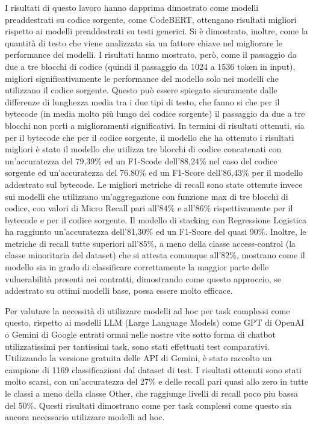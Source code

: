 \documentclass[../../Thesis.tex]{subfiles}
\begin{document}
I risultati di questo lavoro hanno dapprima dimostrato come modelli preaddestrati su codice sorgente, come CodeBERT, ottengano risultati migliori rispetto ai modelli preaddestrati su testi generici. Si \`e dimostrato, inoltre, come la quantit\`a di testo che viene analizzata sia un fattore chiave nel migliorare le performance dei modelli. I risultati hanno mostrato, per\`o, come il passaggio da due a tre blocchi di codice (quindi il passaggio da 1024 a 1536 token in input), migliori significativamente le performance del modello solo nei modelli che utilizzano il codice sorgente. Questo pu\`o essere spiegato sicuramente dalle differenze di lunghezza media tra i due tipi di testo, che fanno si che per il bytecode (in media molto pi\`u lungo del codice sorgente) il passaggio da due a tre blocchi non porti a miglioramenti significativi. 
In termini di risultati ottenuti, sia per il bytecode che per il codice sorgente, il modello che ha ottenuto i risultati migliori \`e stato il modello che utilizza tre blocchi di codice concatenati con un'accuratezza del 79,39\% ed un F1-Scode dell'88,24\% nel caso del codice sorgente ed un'accuratezza del 76.80\% ed un F1-Score dell'86,43\% per il modello addestrato sul bytecode. Le migliori metriche di recall sono state ottenute invece sui modelli che utilizzano  un'aggregazione con funzione max di tre blocchi di codice, con valori di Micro Recall pari all'84\% e all'86\% rispettivamente per il bytecode e per il codice sorgente.
Il modello di stacking con Regressione Logistica ha raggiunto un'accuratezza dell'81,30\% ed un F1-Score del quasi 90\%. Inoltre, le metriche di recall tutte superiori all'85\%, a meno della classe access-control (la classe minoritaria del dataset) che si attesta comunque all'82\%, mostrano come il modello sia in grado di classificare correttamente la maggior parte delle vulnerabilit\`a presenti nei contratti, dimostrando come questo approccio, se addestrato su ottimi modelli base, possa essere molto efficace.

Per valutare la necessit\`a di utilizzare modelli ad hoc per task complessi come questo, rispetto ai modelli LLM (Large Language Models) come GPT di OpenAI o Gemini di Google entrati ormai nelle nostre vite sotto forma di chatbot utilizzatissimi per tantissimi task, sono stati effettuati test comparativi. Utilizzando la versione gratuita delle API di Gemini, \`e stato raccolto un campione di 1169 classificazioni dal dataset di test. I risultati ottenuti sono stati molto scarsi, con un'accuratezza del 27\% e delle recall pari quasi allo zero in tutte le classi a meno della classe Other, che raggiunge livelli di recall poco piu bassa del 50\%. Questi risultati dimostrano come per task complessi come questo sia ancora necessario utilizzare modelli ad hoc.
\end{document}
